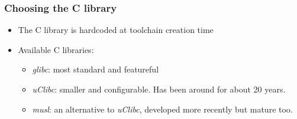 \begin{frame}
\frametitle{Choosing the C library}
\begin{itemize}
  \item The C library is hardcoded at toolchain creation time
  \item Available C libraries:
  \begin{itemize}
    \item {\em glibc}: most standard and featureful
    \item {\em uClibc}: smaller and configurable. Has been around for
	about 20 years.
    \item {\em musl}: an alternative to {\em uClibc}, developed more
        recently but mature too.
  \end{itemize}
\end{itemize}
\end{frame}

